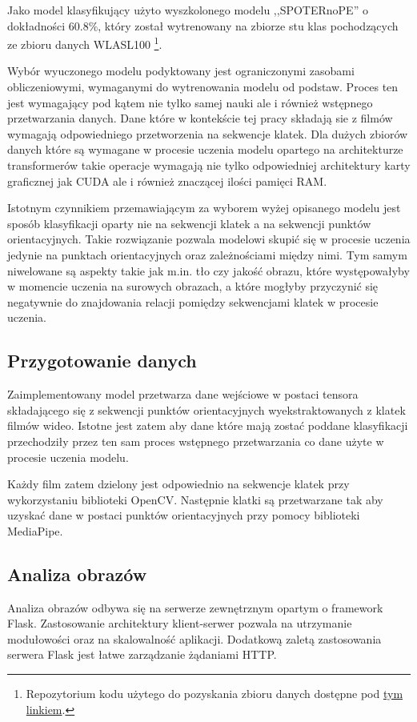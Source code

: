 Jako model klasyfikujący użyto wyszkolonego modelu ,,SPOTERnoPE'' o dokładności $60.8\%$, który został wytrenowany na zbiorze stu klas pochodzących ze zbioru danych WLASL100 \footnote{Repozytorium kodu użytego do pozyskania zbioru danych dostępne pod \href{https://gist.github.com/wojteklu/73c6914cc446146b8b533c0988cf8d29}{tym linkiem}.}.

Wybór wyuczonego modelu podyktowany jest ograniczonymi zasobami obliczeniowymi, wymaganymi do wytrenowania modelu od podstaw.
Proces ten jest wymagający pod kątem nie tylko samej nauki ale i również wstępnego przetwarzania danych.
Dane które w kontekście tej pracy składają sie z filmów wymagają odpowiedniego przetworzenia na sekwencje klatek.
Dla dużych zbiorów danych które są wymagane w procesie uczenia modelu opartego na architekturze transformerów takie operacje wymagają nie tylko odpowiedniej architektury karty graficznej jak CUDA ale i również znaczącej ilości pamięci RAM.

Istotnym czynnikiem przemawiającym za wyborem wyżej opisanego modelu jest sposób klasyfikacji oparty nie na sekwencji klatek a na sekwencji punktów orientacyjnych.
Takie rozwiązanie pozwala modelowi skupić się w procesie uczenia jedynie na punktach orientacyjnych oraz zależnościami między nimi.
Tym samym niwelowane są aspekty takie jak m.in. tło czy jakość obrazu, które występowałyby w momencie uczenia na surowych obrazach, a które mogłyby przyczynić się negatywnie do znajdowania relacji pomiędzy sekwencjami klatek w procesie uczenia.


\subsection{Przygotowanie danych}
Zaimplementowany model przetwarza dane wejściowe w postaci tensora składającego się z sekwencji punktów orientacyjnych wyekstraktowanych z klatek filmów wideo.
Istotne jest zatem aby dane które mają zostać poddane klasyfikacji przechodziły przez ten sam proces wstępnego przetwarzania co dane użyte w procesie uczenia modelu.

Każdy film zatem dzielony jest odpowiednio na sekwencje klatek przy wykorzystaniu biblioteki OpenCV. Następnie klatki są przetwarzane tak aby uzyskać dane w postaci punktów orientacyjnych przy pomocy biblioteki MediaPipe.

\subsection{Analiza obrazów}
Analiza obrazów odbywa się na serwerze zewnętrznym opartym o framework Flask.
Zastosowanie architektury klient-serwer pozwala na utrzymanie modułowości oraz na skalowalność aplikacji.
Dodatkową zaletą zastosowania serwera Flask jest łatwe zarządzanie żądaniami HTTP.

